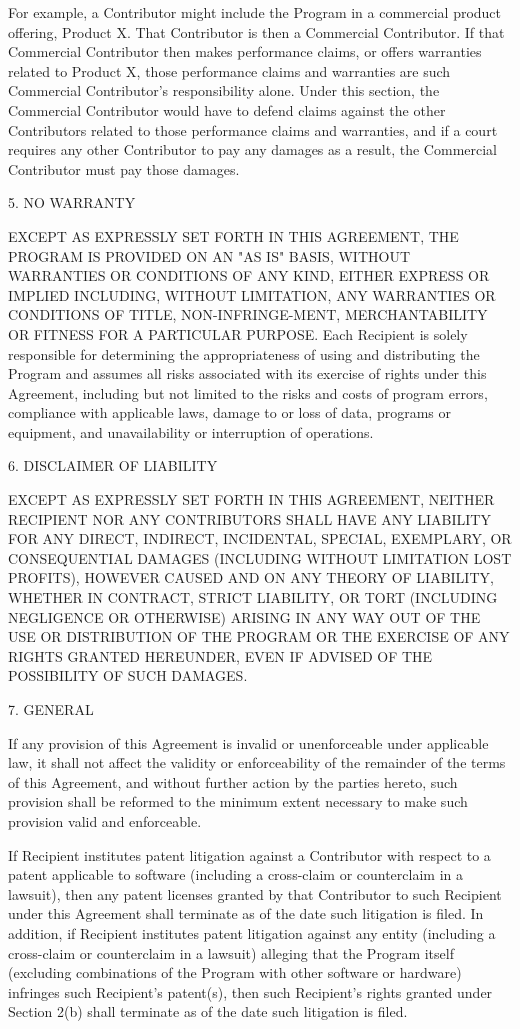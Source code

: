 For example, a Contributor might include the Program in a commercial product offering, Product X. That Contributor is then a Commercial Contributor. If that Commercial Contributor then makes performance claims, or offers warranties related to Product X, those performance claims and warranties are such Commercial Contributor's responsibility alone. Under this section, the Commercial Contributor would have to defend claims against the other Contributors related to those performance claims and warranties, and if a court requires any other Contributor to pay any damages as a result, the Commercial Contributor must pay those damages.

5. NO WARRANTY

EXCEPT AS EXPRESSLY SET FORTH IN THIS AGREEMENT, THE PROGRAM IS PROVIDED ON AN "AS IS" BASIS, WITHOUT WARRANTIES OR CONDITIONS OF ANY KIND, EITHER EXPRESS OR IMPLIED INCLUDING, WITHOUT LIMITATION, ANY WARRANTIES OR CONDITIONS OF TITLE, NON-INFRINGE-MENT, MERCHANTABILITY OR FITNESS FOR A PARTICULAR PURPOSE. Each Recipient is solely responsible for determining the appropriateness of using and distributing the Program and assumes all risks  associated with its exercise of rights under this Agreement, including but not limited to the risks and costs of program errors, compliance with applicable laws, damage to or loss of data, programs or equipment, and unavailability or interruption of operations.

6. DISCLAIMER OF LIABILITY

EXCEPT AS EXPRESSLY SET FORTH IN THIS AGREEMENT, NEITHER RECIPIENT NOR ANY CONTRIBUTORS SHALL HAVE ANY LIABILITY FOR ANY DIRECT, INDIRECT, INCIDENTAL, SPECIAL, EXEMPLARY, OR CONSEQUENTIAL DAMAGES (INCLUDING WITHOUT LIMITATION LOST PROFITS), HOWEVER CAUSED AND ON ANY THEORY OF LIABILITY, WHETHER IN CONTRACT, STRICT LIABILITY, OR TORT (INCLUDING NEGLIGENCE OR OTHERWISE) ARISING IN ANY WAY  OUT OF THE USE OR DISTRIBUTION OF THE PROGRAM OR THE EXERCISE OF ANY RIGHTS GRANTED HEREUNDER, EVEN IF ADVISED OF THE POSSIBILITY OF SUCH DAMAGES.

7. GENERAL

If any provision of this Agreement is invalid or unenforceable under applicable law, it shall not affect the validity or enforceability of the remainder of the terms of this Agreement, and without further action by the parties hereto, such  provision shall be reformed to the minimum extent necessary to make such provision valid and enforceable.

If Recipient institutes patent litigation against a Contributor with respect to a patent applicable to software (including a cross-claim or counterclaim in a lawsuit), then any patent licenses granted by that Contributor to such Recipient under this Agreement shall terminate as of the date such litigation is filed. In addition, if Recipient institutes patent litigation against any entity (including a cross-claim or counterclaim in a lawsuit) alleging that the Program itself (excluding combinations of the Program with other software or hardware) infringes such Recipient's patent(s), then such Recipient's rights granted under Section 2(b) shall terminate as of the date such litigation is filed.

